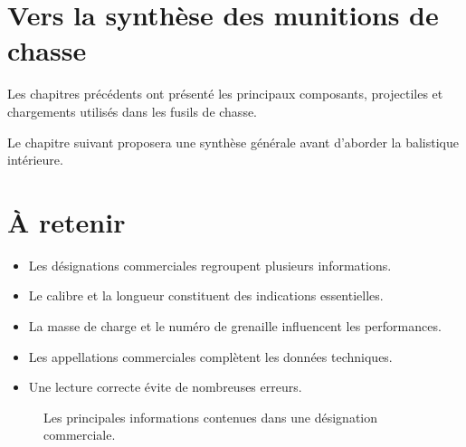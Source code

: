 \section{Vers la synthèse des munitions de chasse}

Les chapitres précédents ont présenté les principaux composants, projectiles
et chargements utilisés dans les fusils de chasse.

Le chapitre suivant proposera une synthèse générale avant d'aborder la
balistique intérieure.

\section{À retenir}

\begin{aretenir}

\begin{itemize}
    \item Les désignations commerciales regroupent plusieurs informations.
    \item Le calibre et la longueur constituent des indications essentielles.
    \item La masse de charge et le numéro de grenaille influencent les
          performances.
    \item Les appellations commerciales complètent les données techniques.
    \item Une lecture correcte évite de nombreuses erreurs.
\end{itemize}

\end{aretenir}

\begin{figure}[htbp]
\centering


\caption{Les principales informations contenues dans une désignation commerciale.}
\label{fig:hierarchie_designation}

\end{figure}
